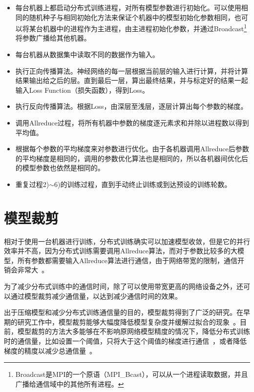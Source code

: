\begin{itemize}
    \item [1)]
    每台机器上都启动分布式训练进程，对所有模型参数进行初始化。可以使用相同的随机种子与相同初始化方法来保证个机器中的模型初始化参数相同，也可以将某台机器中的进程作为主进程，由主进程初始化参数，并通过Broadcast\footnote{Broadcast是MPI的一个原语（MPI\_Bcast），可以从一个进程读取数据，并且广播给通信域中的其他所有进程。}将参数广播给其他机器。
    \item [2)]
    每台机器从数据集中读取不同的数据作为输入。
    \item [3)]
    执行正向传播算法。神经网络的每一层根据当前层的输入进行计算，并将计算结果输出给之后的层。直到最后一层，算出最终结果，并与标定好的结果一起输入Loss Function（损失函数），得到Loss。
    \item [4)]
    执行反向传播算法。根据Loss，由深层至浅层，逐层计算出每个参数的梯度。
    \item [5)]
    调用Allreduce过程，将所有机器中参数的梯度逐元素求和并除以进程数以得到平均值。
    \item [6)]
    根据每个参数的平均梯度来对参数进行优化。由于各机器调用Allreduce后参数的平均梯度是相同的，调用的参数优化算法也是相同的，所以各机器间优化后的模型参数也依然是相同的。
    \item [7)]
    重复过程2)$\sim$6)的训练过程，直到手动终止训练或到达预设的训练轮数。
\end{itemize}

\section{模型裁剪}

相对于使用一台机器进行训练，分布式训练确实可以加速模型收敛，但是它的并行效率并不高，因为分布式训练需要调用Allreduce算法，而对于参数比较多的大模型，所有参数都需要输入Allreduce算法进行通信，由于网络带宽的限制，通信开销会非常大~\cite{li2014communication, wen2017terngrad}。

为了减少分布式训练中的通信时间，除了可以使用带宽更高的网络设备之外，还可以通过模型裁剪减少通信量，以达到减少通信时间的效果。

出于压缩模型和减少分布式训练通信量的目的，模型裁剪得到了广泛的研究。在早期的研究工作中，模型裁剪能够大幅度降低模型复杂度并缓解过拟合的现象~\cite{lecun1990optimal, hanson1989comparing, hassibi1993second}。目前，模型裁剪的方法大多能够在不影响原网络模型精度的情况下，降低分布式训练时的通信量，比如设置一个阈值，只将大于这个阈值的梯度进行通信~\cite{strom2015scalable}，或者降低梯度的精度以减少总通信量~\cite{seide20141}。

